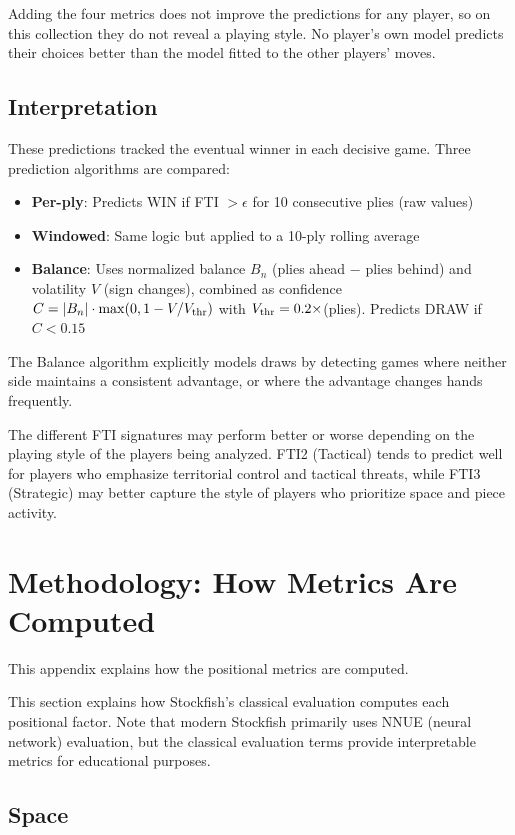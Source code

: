 \documentclass[11pt]{book}
\begin{document}
Adding the four metrics does not improve the predictions for any player, so on this collection they do not reveal a playing style.
 No player's own model predicts their choices better than the model fitted to the other players' moves.


\section{Interpretation}

These predictions tracked the eventual winner in each decisive game. 
Three prediction algorithms are compared:
\begin{itemize}
\item \textbf{Per-ply}: Predicts WIN if FTI $> \epsilon$ for 10 consecutive plies (raw values)
\item \textbf{Windowed}: Same logic but applied to a 10-ply rolling average
\item \textbf{Balance}: Uses normalized balance $B_n$ (plies ahead $-$ plies behind) and volatility $V$ (sign changes), combined as confidence $C = |B_n|\cdot\max(0, 1 - V/V_{\rm thr})$ with $V_{\rm thr} = 0.2\times$(plies). Predicts DRAW if $C < 0.15$
\end{itemize}

The Balance algorithm explicitly models draws by detecting games where neither side maintains a consistent advantage, or where the advantage changes hands frequently.

The different FTI signatures may perform better or worse depending on the playing style of the players being analyzed. FTI2 (Tactical) tends to predict well for players who emphasize territorial control and tactical threats, while FTI3 (Strategic) may better capture the style of players who prioritize space and piece activity.

\appendix
\chapter{Methodology: How Metrics Are Computed}

This appendix explains how the positional metrics are computed.


This section explains how Stockfish's classical evaluation computes each positional factor. Note that modern Stockfish primarily uses NNUE (neural network) evaluation, but the classical evaluation terms provide interpretable metrics for educational purposes.

\section{Space}
\end{document}
